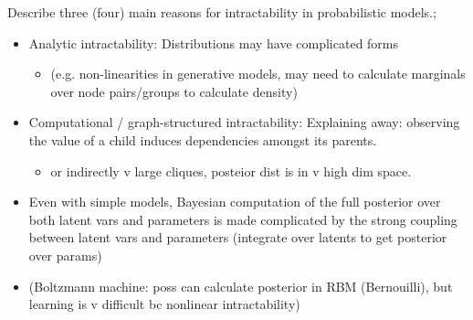 \documentclass{article}
\begin{document}
Describe three (four) main reasons for intractability in probabilistic models.; \begin{itemize}
    \item Analytic intractability: Distributions may have complicated forms \begin{itemize}
        \item (e.g. non-linearities in generative models, may need to calculate marginals over node pairs/groups to calculate density)
    \end{itemize}
    \item Computational / graph-structured intractability: Explaining away: observing the value of a child induces dependencies amongst its parents.
    \begin{itemize}
        \item or indirectly v large cliques, posteior dist is in v high dim space.
    \end{itemize}
    \item Even with simple models, Bayesian computation of the full posterior over both latent vars and parameters is made complicated by the strong coupling between latent vars and parameters (integrate over latents to get posterior over params)
    \item (Boltzmann machine: poss can calculate posterior in RBM (Bernouilli), but learning is v difficult bc nonlinear intractability)
\end{itemize}
\end{document}
